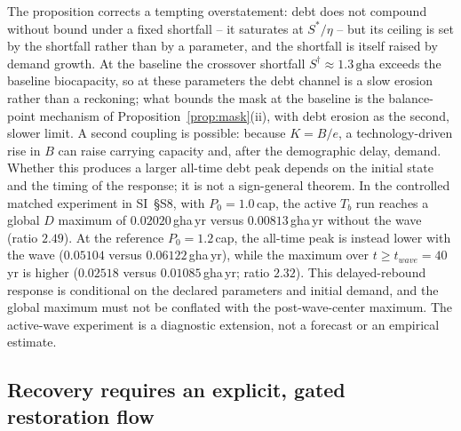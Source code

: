 The proposition corrects a tempting overstatement: debt does not compound without bound under a fixed shortfall -- it saturates at $S^*/\eta$ -- but its ceiling is set by the shortfall rather than by a parameter, and the shortfall is itself raised by demand growth. At the baseline the crossover shortfall $S^\dagger\approx1.3\,\mathrm{gha}$ exceeds the baseline biocapacity, so at these parameters the debt channel is a slow erosion rather than a reckoning; what bounds the mask at the baseline is the balance-point mechanism of Proposition~\ref{prop:mask}(ii), with debt erosion as the second, slower limit. A second coupling is possible: because $K=B/e$, a technology-driven rise in $B$ can raise carrying capacity and, after the demographic delay, demand. Whether this produces a larger all-time debt peak depends on the initial state and the timing of the response; it is not a sign-general theorem. In the controlled matched experiment in SI~\S S8, with $P_0=1.0$\,cap, the active $T_b$ run reaches a global $D$ maximum of $0.02020$\,gha\,yr versus $0.00813$\,gha\,yr without the wave (ratio $2.49$). At the reference $P_0=1.2$\,cap, the all-time peak is instead lower with the wave ($0.05104$ versus $0.06122$\,gha\,yr), while the maximum over $t\ge t_{wave}=40$\,yr is higher ($0.02518$ versus $0.01085$\,gha\,yr; ratio $2.32$). This delayed-rebound response is conditional on the declared parameters and initial demand, and the global maximum must not be conflated with the post-wave-center maximum. The active-wave experiment is a diagnostic extension, not a forecast or an empirical estimate.

\subsection{Recovery requires an explicit, gated restoration flow}\label{sec:recovery}


